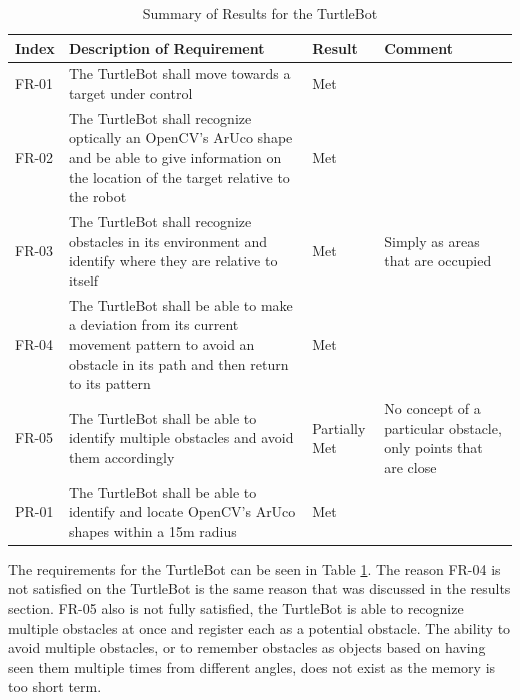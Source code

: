 \documentclass{article}[12]
\begin{document}
	\begin{table}[H]
  \small
		\begin{tabular}{p{2cm} p{8cm} p{2cm} p{3cm}} 
			\hline
			{\textbf{Index}} & {\textbf{Description of Requirement}} & {\textbf{Result}} & {\textbf{Comment}} \\ \hline
FR-01 & The TurtleBot shall move towards a target under control & Met & \\
FR-02 & The TurtleBot shall recognize optically an OpenCV's ArUco shape and be able to give information on the location of the target relative to the robot & Met & \\
FR-03 & The TurtleBot shall recognize obstacles in its environment and identify where they are relative to itself & Met & Simply as areas that are occupied \\
FR-04 & The TurtleBot shall be able to make a deviation from its current movement pattern to avoid an obstacle in its path and then return to its pattern & Met & \\
FR-05 & The TurtleBot shall be able to identify multiple obstacles and avoid them accordingly & Partially Met & No concept of a particular obstacle, only points that are close \\
PR-01 & The TurtleBot shall be able to identify and locate OpenCV's ArUco shapes within a 15m radius & Met & \\ \hline
     \end{tabular}
     \caption{Summary of Results for the TurtleBot}
     \label{table:turtlbotresults}
 \end{table}

 The requirements for the TurtleBot can be seen in Table \ref{table:turtlbotresults}. The reason FR-04 is not satisfied on the TurtleBot is the same reason that was discussed in the results section. FR-05 also is not fully satisfied, the TurtleBot is able to recognize multiple obstacles at once and register each as a potential obstacle. The ability to avoid multiple obstacles, or to remember obstacles as objects based on having seen them multiple times from different angles, does not exist as the memory is too short term.
\end{document}
